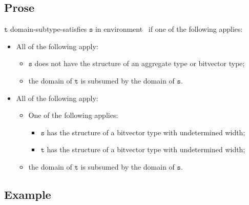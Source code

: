 \documentclass{book}
\newcommand\vt[0]{\texttt{t}}
\newcommand\vs[0]{\texttt{s}}
\begin{document}
\subsection{Prose}
 $\vt$ domain-subtype-satisfies $\vs$ in environment \tenv\ if one of the following applies:
 \begin{itemize}
 \item All of the following apply:
    \begin{itemize}
    \item $\vs$ does not have the structure of an aggregate type or bitvector type;
    \item the domain of $\vt$ is subsumed by the domain of $\vs$.
    \end{itemize}

  \item All of the following apply:
  \begin{itemize}
    \item One of the following applies:
      \begin{itemize}
      \item $\vs$ has the structure of a bitvector type with undetermined width;
      \item $\vt$ has the structure of a bitvector type with undetermined width;
      \end{itemize}
   \item the domain of $\vt$ is subsumed by the domain of $\vs$.
   \end{itemize}
  \end{itemize}

  \subsection{Example}


\end{document}
